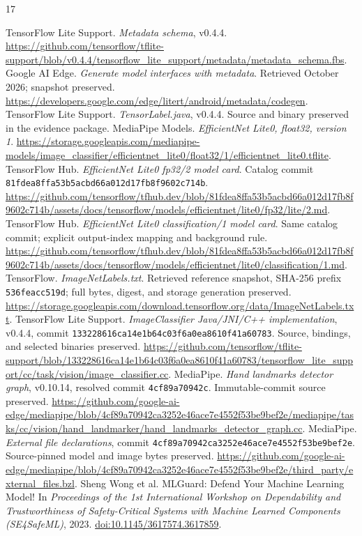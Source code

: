 \documentclass[10pt,twocolumn,letterpaper]{article}
\newcommand{\code}[1]{\texttt{#1}}
\begin{document}
\begin{thebibliography}{17}\small\raggedright
{} TensorFlow Lite Support. \emph{Metadata schema}, v0.4.4. \url{https://github.com/tensorflow/tflite-support/blob/v0.4.4/tensorflow_lite_support/metadata/metadata_schema.fbs}.
 Google AI Edge. \emph{Generate model interfaces with metadata}. Retrieved October 2026; snapshot preserved. \url{https://developers.google.com/edge/litert/android/metadata/codegen}.
 TensorFlow Lite Support. \emph{TensorLabel.java}, v0.4.4. Source and binary preserved in the evidence package.
 MediaPipe Models. \emph{EfficientNet Lite0, float32, version 1}. \url{https://storage.googleapis.com/mediapipe-models/image_classifier/efficientnet_lite0/float32/1/efficientnet_lite0.tflite}.
 TensorFlow Hub. \emph{EfficientNet Lite0 fp32/2 model card}. Catalog commit \code{81fdea8ffa53b5acbd66a012d17fb8f9602c714b}. \url{https://github.com/tensorflow/tfhub.dev/blob/81fdea8ffa53b5acbd66a012d17fb8f9602c714b/assets/docs/tensorflow/models/efficientnet/lite0/fp32/lite/2.md}.
 TensorFlow Hub. \emph{EfficientNet Lite0 classification/1 model card}. Same catalog commit; explicit output-index mapping and background rule. \url{https://github.com/tensorflow/tfhub.dev/blob/81fdea8ffa53b5acbd66a012d17fb8f9602c714b/assets/docs/tensorflow/models/efficientnet/lite0/classification/1.md}.
 TensorFlow. \emph{ImageNetLabels.txt}. Retrieved reference snapshot, SHA-256 prefix \code{536feacc519d}; full bytes, digest, and storage generation preserved. \url{https://storage.googleapis.com/download.tensorflow.org/data/ImageNetLabels.txt}.
 TensorFlow Lite Support. \emph{ImageClassifier Java/JNI/C++ implementation}, v0.4.4, commit \code{133228616ca14e1b64c03f6a0ea8610f41a60783}. Source, bindings, and selected binaries preserved. \url{https://github.com/tensorflow/tflite-support/blob/133228616ca14e1b64c03f6a0ea8610f41a60783/tensorflow_lite_support/cc/task/vision/image_classifier.cc}.
 MediaPipe. \emph{Hand landmarks detector graph}, v0.10.14, resolved commit \code{4cf89a70942c}. Immutable-commit source preserved. \url{https://github.com/google-ai-edge/mediapipe/blob/4cf89a70942ca3252e46ace7e4552f53be9bef2e/mediapipe/tasks/cc/vision/hand_landmarker/hand_landmarks_detector_graph.cc}.
 MediaPipe. \emph{External file declarations}, commit \code{4cf89a70942ca3252e46ace7e4552f53be9bef2e}. Source-pinned model and image bytes preserved. \url{https://github.com/google-ai-edge/mediapipe/blob/4cf89a70942ca3252e46ace7e4552f53be9bef2e/third_party/external_files.bzl}.
 Sheng Wong et al. MLGuard: Defend Your Machine Learning Model! In \emph{Proceedings of the 1st International Workshop on Dependability and Trustworthiness of Safety-Critical Systems with Machine Learned Components (SE4SafeML)}, 2023. \href{https://doi.org/10.1145/3617574.3617859}{doi:10.1145/3617574.3617859}.


\end{thebibliography}
\end{document}
